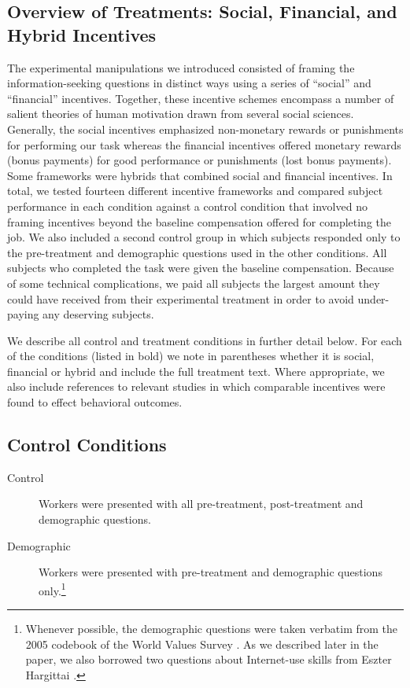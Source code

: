 \documentclass{cscw2010}
\begin{document}
\subsection{Overview of Treatments: Social, Financial, and Hybrid Incentives}

The experimental manipulations we introduced consisted of framing the
information-seeking questions in distinct ways using a series of ``social''
and ``financial'' incentives. Together, these incentive
schemes encompass a number of salient theories of human motivation drawn from
several social sciences. Generally,
the social incentives emphasized non-monetary rewards or
punishments for performing our task whereas the
financial incentives offered monetary rewards (bonus payments)
for good performance or punishments (lost bonus payments). Some
frameworks were hybrids that combined social and financial
incentives. In total, we tested fourteen different incentive
frameworks and compared subject performance in each condition against a
control condition that involved no framing incentives beyond the
baseline compensation offered for completing the job. We also included
a second control group in which subjects responded only to the
pre-treatment and demographic questions used in the other
conditions. All subjects who completed the task were given the baseline
compensation. Because of some technical complications, we paid all subjects the largest amount they could have received from
their experimental treatment in order to avoid under-paying any
deserving subjects.

We describe all control and treatment conditions in further detail
below. For each of the conditions (listed in bold) we note in parentheses whether it is social, financial or hybrid and include the full treatment text. Where appropriate, we also include references to relevant studies in which comparable
incentives were found to effect behavioral outcomes.

\subsection{Control Conditions} 

\begin{description}
\item[Control] Workers were presented with all pre-treatment, post-treatment and demographic questions.
\item[Demographic] Workers were presented with pre-treatment and demographic questions only.\footnote{Whenever possible, the demographic questions were taken verbatim from the 2005 codebook of the World Values Survey \cite{world_vals_survey2009}. As we described later in the paper, we also borrowed two questions about Internet-use skills from Eszter Hargittai \cite{hargittai2009update}.}
\end{description}
\end{document}
